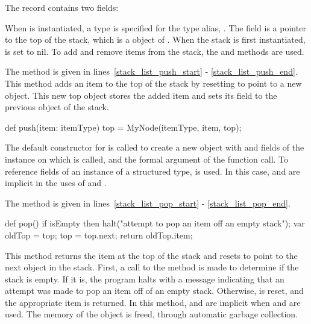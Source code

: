The  record contains two fields:
\begin{chapel}
record Stack {                      
  type itemType;                   
  var top: MyNode(itemType);      
\end{chapel}
When  is instantiated, a type is specified for the type
alias, .  The  field is a pointer to the top
of the stack, which is a  object of .  When
the stack is first instantiated,  is set to nil.  To 
add and remove items from the stack, the  and  
methods are used.

The  method is given in lines~\ref{stack_list_push_start} -
\ref{stack_list_push_end}.  This method adds an item to the top of the stack
by resetting  to point to a new  object.  This new
top object stores the added item and sets its  field to the previous
 object of the stack.
\begin{chapel}
  def push(item: itemType) {        
    top = MyNode(itemType, item, top); 
  }                                 
\end{chapel}
The default constructor for  is called to create a new
object with  and  fields
of the  instance on which  is called, and the
formal argument  of the  function call.
To reference
fields of an instance of a structured type,  is used.
In this case,  and  are 
implicit in the uses of  and . 

The  method is given in lines~\ref{stack_list_pop_start} -
\ref{stack_list_pop_end}.  
\begin{chapel}
  def pop() {           
    if isEmpty then   
      halt("attempt to pop an item off an empty stack"); 
    var oldTop = top;               
    top = top.next;                
    return oldTop.item;           
  }                              
\end{chapel}
This method returns the item at the top of
the stack and resets  to point to the next object in the stack.
First, a call to the  method  is made to 
determine if the stack is
empty.  If it is, the program halts with a message indicating that 
an attempt was made to pop an item off of an empty stack.  Otherwise,
 is reset, and the appropriate item is returned.
In this method,  and  are implicit when
 and  are used.
The memory of the  object is freed, through automatic
garbage collection.

